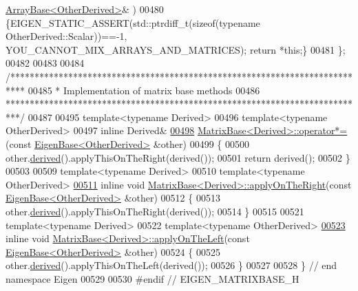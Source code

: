 \begin{DoxyCode}
      \hyperlink{group___core___module_class_eigen_1_1_array_base}{ArrayBase<OtherDerived>}& )
00480     \{EIGEN\_STATIC\_ASSERT(std::ptrdiff\_t(\textcolor{keyword}{sizeof}(\textcolor{keyword}{typename} OtherDerived::Scalar))==-1,
      YOU\_CANNOT\_MIX\_ARRAYS\_AND\_MATRICES); \textcolor{keywordflow}{return} *\textcolor{keyword}{this};\}
00481 \};
00482 
00483 
00484 \textcolor{comment}{/***************************************************************************}
00485 \textcolor{comment}{* Implementation of matrix base methods}
00486 \textcolor{comment}{***************************************************************************/}
00487 
00495 \textcolor{keyword}{template}<\textcolor{keyword}{typename} Derived>
00496 \textcolor{keyword}{template}<\textcolor{keyword}{typename} OtherDerived>
00497 \textcolor{keyword}{inline} Derived&
\hyperlink{group___core___module_a3783b6168995ca117a1c19fea3630ac4}{00498} \hyperlink{group___core___module_a3783b6168995ca117a1c19fea3630ac4}{MatrixBase<Derived>::operator*=}(\textcolor{keyword}{const} 
      \hyperlink{group___core___module_struct_eigen_1_1_eigen_base}{EigenBase<OtherDerived>} &other)
00499 \{
00500   other.\hyperlink{group___core___module_a324b16961a11d2ecfd2d1b7dd7946545}{derived}().applyThisOnTheRight(derived());
00501   \textcolor{keywordflow}{return} derived();
00502 \}
00503 
00509 \textcolor{keyword}{template}<\textcolor{keyword}{typename} Derived>
00510 \textcolor{keyword}{template}<\textcolor{keyword}{typename} OtherDerived>
\hyperlink{group___core___module_a45d91752925d2757fc8058a293b15462}{00511} \textcolor{keyword}{inline} \textcolor{keywordtype}{void} \hyperlink{group___core___module_a45d91752925d2757fc8058a293b15462}{MatrixBase<Derived>::applyOnTheRight}(\textcolor{keyword}{const} 
      \hyperlink{group___core___module_struct_eigen_1_1_eigen_base}{EigenBase<OtherDerived>} &other)
00512 \{
00513   other.\hyperlink{group___core___module_a324b16961a11d2ecfd2d1b7dd7946545}{derived}().applyThisOnTheRight(derived());
00514 \}
00515 
00521 \textcolor{keyword}{template}<\textcolor{keyword}{typename} Derived>
00522 \textcolor{keyword}{template}<\textcolor{keyword}{typename} OtherDerived>
\hyperlink{group___core___module_a3a08ad41e81d8ad4a37b5d5c7490e765}{00523} \textcolor{keyword}{inline} \textcolor{keywordtype}{void} \hyperlink{group___core___module_a3a08ad41e81d8ad4a37b5d5c7490e765}{MatrixBase<Derived>::applyOnTheLeft}(\textcolor{keyword}{const} 
      \hyperlink{group___core___module_struct_eigen_1_1_eigen_base}{EigenBase<OtherDerived>} &other)
00524 \{
00525   other.\hyperlink{group___core___module_a324b16961a11d2ecfd2d1b7dd7946545}{derived}().applyThisOnTheLeft(derived());
00526 \}
00527 
00528 \} \textcolor{comment}{// end namespace Eigen}
00529 
00530 \textcolor{preprocessor}{#endif // EIGEN\_MATRIXBASE\_H}
\end{DoxyCode}
